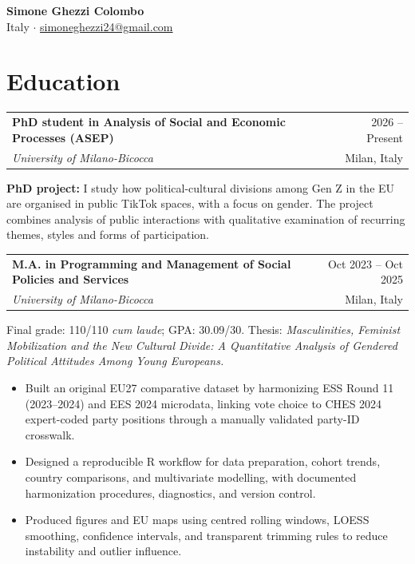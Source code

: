 \documentclass[11pt,a4paper]{article}
\makeatletter
\newcommand{\nameheader}[3]{%
  {\LARGE\bfseries #1}\\[0.35em]
  #2 \enspace $\cdot$ \enspace \href{mailto:#3}{#3}\\[0.2em]
}
\newcommand{\cventry}[4]{%
  \begin{tabularx}{\textwidth}{@{}Xr@{}}
    {\textbf{#1}} & {#4}\\
    {\emph{#2}} & {#3}
  \end{tabularx}\vspace{0.2em}
}
\makeatother
\begin{document}
\nameheader{Simone Ghezzi Colombo}{Italy}{simoneghezzi24@gmail.com}

\section*{Education}

\cventry{PhD student in Analysis of Social and Economic Processes (ASEP)}{University of Milano-Bicocca}{Milan, Italy}{2026 -- Present}
\textbf{PhD project:} I study how political-cultural divisions among Gen Z in the EU are organised in public TikTok spaces, with a focus on gender. The project combines analysis of public interactions with qualitative examination of recurring themes, styles and forms of participation.

\cventry{M.A. in Programming and Management of Social Policies and Services}{University of Milano-Bicocca}{Milan, Italy}{Oct 2023 -- Oct 2025}
Final grade: 110/110 \emph{cum laude}; GPA: 30.09/30. Thesis: \emph{Masculinities, Feminist Mobilization and the New Cultural Divide: A Quantitative Analysis of Gendered Political Attitudes Among Young Europeans.}
\begin{itemize}
  \item Built an original EU27 comparative dataset by harmonizing ESS Round 11 (2023--2024) and EES 2024 microdata, linking vote choice to CHES 2024 expert-coded party positions through a manually validated party-ID crosswalk.
  \item Designed a reproducible R workflow for data preparation, cohort trends, country comparisons, and multivariate modelling, with documented harmonization procedures, diagnostics, and version control.
  \item Produced figures and EU maps using centred rolling windows, LOESS smoothing, confidence intervals, and transparent trimming rules to reduce instability and outlier influence.
\end{itemize}
\end{document}
